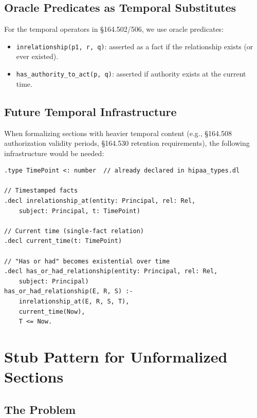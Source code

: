 \documentclass[11pt,letterpaper]{article}
\begin{document}
\subsection{Oracle Predicates as Temporal Substitutes}

For the temporal operators in \S 164.502/506, we use oracle predicates:
\begin{itemize}
  \item \texttt{inrelationship(p1, r, q)}: asserted as a fact if the relationship exists (or ever existed).
  \item \texttt{has\_authority\_to\_act(p, q)}: asserted if authority exists at the current time.
\end{itemize}

\subsection{Future Temporal Infrastructure}

When formalizing sections with heavier temporal content (e.g., \S 164.508 authorization validity periods, \S 164.530 retention requirements), the following infrastructure would be needed:

\begin{lstlisting}[style=soufflestyle,caption={Sketch of temporal infrastructure}]
.type TimePoint <: number  // already declared in hipaa_types.dl

// Timestamped facts
.decl inrelationship_at(entity: Principal, rel: Rel,
    subject: Principal, t: TimePoint)

// Current time (single-fact relation)
.decl current_time(t: TimePoint)

// "Has or had" becomes existential over time
.decl has_or_had_relationship(entity: Principal, rel: Rel,
    subject: Principal)
has_or_had_relationship(E, R, S) :-
    inrelationship_at(E, R, S, T),
    current_time(Now),
    T <= Now.
\end{lstlisting}


\section{Stub Pattern for Unformalized Sections}
\label{sec:stubs}

\subsection{The Problem}
\end{document}

